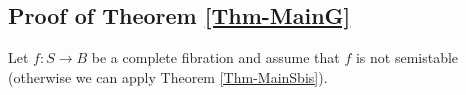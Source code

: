 \documentclass[a4paper,11pt]{amsart}
\newtheorem{proposition}[theorem]{Proposition}
\begin{document}
{ 					\subsection{Proof of Theorem \ref{Thm-MainG}} Let $f:S\to B$ be a complete fibration and assume that $f$ is not semistable (otherwise we can apply Theorem \ref{Thm-MainSbis}). 
%                   
%                   
}
\end{document}
